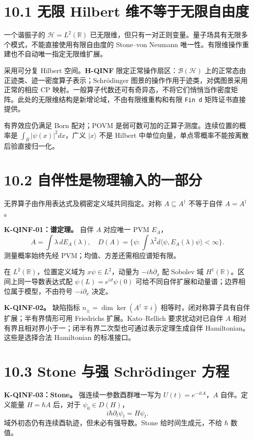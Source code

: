 \documentclass[
  11pt,
  oneside]{book}
\begin{document}
\section{10.1 无限 Hilbert 维不等于无限自由度}

一个谐振子的 \(\mathcal H=L^2(\mathbb R)\)
已无限维，但只有一对正则变量。量子场具有无限多个模式，不能直接使用有限自由度的
Stone--von Neumann 唯一性。有限维操作重建也不自动唯一指定无限维扩展。

采用可分复 Hilbert 空间。\textbf{H-QINF}
限定正常操作扇区：\(\mathcal B(\mathcal H)\)
上的正常态由正迹类、迹一密度算子表示；Schrödinger
图景的操作作用于迹类，对偶图景采用正常的相应 CP
映射。一般算子代数还可有奇异态，不将它们悄悄当作密度矩阵。此处的无限维结构是新增论域，不由有限维重构和有限
\texttt{Fin\ d} 矩阵证书直接提供。

有界效应仍满足 Born 配对；POVM
是弱可数可加的正算子测度。连续位置的概率是 \(\int_B|\psi(x)|^2dx\)，广义
\(|x\rangle\) 不是 Hilbert
中单位向量，单点零概率不能按离散后验直接归一化。

\section{10.2 自伴性是物理输入的一部分}

无界算子由作用表达式及稠密定义域共同指定。对称 \(A\subseteq A^\dagger\)
不等于自伴 \(A=A^\dagger\)。

\textbf{K-QINF-01：谱定理。} 自伴 \(A\) 对应唯一 PVM \(E_A\)， \[
A=\int\lambda\,dE_A(\lambda),\quad
D(A)=\{\psi:\int\lambda^2d\langle\psi,E_A(\lambda)\psi\rangle<\infty\}.
\] 测量概率始终先经 PVM；均值、方差还需相应谱矩有限。

在 \(L^2(\mathbb R)\)，位置定义域为 \(x\psi\in L^2\)，动量为
\(-i\hbar\partial_x\) 配 Sobolev 域
\(H^1(\mathbb R)\)。区间上同一导数表达式配
\(\psi(L)=e^{i\vartheta}\psi(0)\)
可给不同自伴扩展和动量谱；边界相位属于模型，不由符号 \(-i\partial_x\)
决定。

\textbf{K-QINF-02。} 缺陷指标 \(n_\pm=\dim\ker(A^\dagger\mp i)\)
相等时，闭对称算子具有自伴扩展；半有界情形可用 Friedrichs
扩展。Kato--Rellich 要求扰动对已自伴 \(A\)
相对有界且相对界小于一；闭半有界二次型也可通过表示定理生成自伴
Hamiltonian。这些是选择合法 Hamiltonian 的标准接口。

\section{10.3 Stone 与强 Schrödinger 方程}

\textbf{K-QINF-03：Stone。} 强连续一参数酉群唯一写为
\(U(t)=e^{-itA}\)，\(A\) 自伴。定义能量 \(H=\hbar A\) 后，对于
\(\psi_0\in D(H)\)， \[
i\hbar\partial_t\psi_t=H\psi_t.
\] 域外初态仍有连续酉轨迹，但未必有强导数。Stone 给时间生成元，不给
\(\hbar\) 数值。
\end{document}
